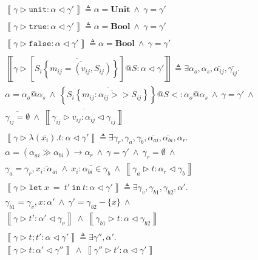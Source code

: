 \documentclass{article}
\newcommand{\inferrule}[4]{\left\llbracket #1 \triangleright #2 : #3 \triangleleft #4 \right\rrbracket}
\newcommand{\inferlhs}[1]{\left\llbracket \gamma \triangleright #1 : \alpha \triangleleft \gamma' \right\rrbracket}
\newcommand{\unitv}{\mathtt{unit}}
\newcommand{\unitt}{\mathbf{Unit}}
\newcommand{\truev}{\mathtt{true}}
\newcommand{\falsev}{\mathtt{false}}
\newcommand{\boolt}{\mathbf{Bool}}
\newcommand{\lett}[3]{\mathtt{let}\:#1\:\mathtt{=}\:#2\:\mathtt{in}\:#3}
\newcommand{\cand}{\:\wedge\:}
\begin{document}
\[
\begin{array}{l}

\inferlhs{\unitv} \triangleq \alpha = \unitt \cand \gamma = \gamma' 
\\\\

\inferlhs{\truev} \triangleq \alpha = \boolt \cand \gamma = \gamma' 
\\\\

\inferlhs{\falsev} \triangleq \alpha = \boolt \cand \gamma = \gamma' 
\\\\

\inferlhs{\left[ \overline{S_i \left\{ \overline{ m_{ij} = (v_{ij}, S_{ij}) } \right\} } \right]@S}
\triangleq
\exists \alpha_o, \alpha_s, \overline{\alpha_{ij}}, \overline{\gamma_{ij}} . \\
\alpha = \alpha_o@\alpha_s
\cand
\left\{ \overline{ S_i \left\{ \overline{ m_{ij} : \alpha_{ij} >> S_{ij} } \right\} }\right\}@S <: \alpha_o@\alpha_s
\cand
\gamma = \gamma'
\cand
\\
\overline{\gamma_{ij} = \emptyset}
\cand
\overline{\inferrule{\gamma_{ij}}{v_{ij}}{\alpha_{ij}}{\gamma_{ij}}}
\\\\

\inferlhs{\lambda ( \overline{x_i} ) . t} \triangleq
\exists \gamma_r, \gamma_a, \gamma_b, \overline{\alpha_{ai}}, \overline{\alpha_{bi}}, \alpha_r . \\
\alpha = (\overline{\alpha_{ai} \gg \alpha_{bi}}) \rightarrow \alpha_r
\cand
\gamma = \gamma'
\cand
\gamma_r = \emptyset
\cand \\
\gamma_a = \gamma_r, \overline{x_i : \alpha_{ai}}
\cand
\overline{x_i : \alpha_{bi} \in \gamma_b}
\cand
\inferrule{\gamma_a}{t}{\alpha_r}{\gamma_b} 
\\\\

\inferlhs{\lett{x}{t'}{t}} \triangleq \exists \gamma_v, \gamma_{b1}, \gamma_{b2}, \alpha' . \\
\gamma_{b1} = \gamma_v, x : \alpha'
\cand
\gamma' = \gamma_{b2} - \{ x \}
\cand \\
\inferrule{\gamma}{t'}{\alpha'}{\gamma_v}
\cand
\inferrule{\gamma_{b1}}{t}{\alpha}{\gamma_{b2}}
\\\\

\inferlhs{t ; t'} \triangleq
\exists \gamma'', \alpha' . \\
\inferrule{\gamma}{t}{\alpha'}{\gamma''}
\cand
\inferrule{\gamma''}{t'}{\alpha}{\gamma'}
\\\\


\end{array}\]
\end{document}
